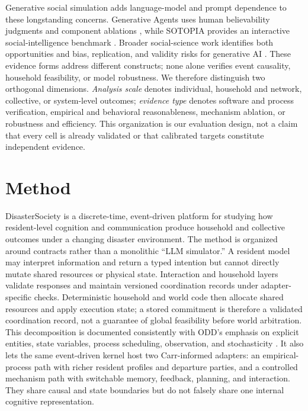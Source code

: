 \documentclass[journal]{IEEEtran}
\begin{document}
Generative social simulation adds language-model and prompt dependence to these
longstanding concerns. Generative Agents uses human believability judgments and
component ablations \cite{park2023generativeagents}, while SOTOPIA provides an
interactive social-intelligence benchmark \cite{zhou2024sotopia}. Broader
social-science work identifies both opportunities and bias, replication, and
validity risks for generative AI \cite{bail2024generativeai}. These evidence
forms address different constructs; none alone verifies event causality,
household feasibility, or model robustness. We
therefore distinguish two orthogonal dimensions. \emph{Analysis scale} denotes
individual, household and network, collective, or system-level outcomes;
\emph{evidence type} denotes software and process verification, empirical and
behavioral reasonableness, mechanism ablation, or robustness and efficiency.
This organization is our evaluation design, not a claim that every cell is
already validated or that calibrated targets constitute independent evidence.


\section{Method}
\label{sec:method}

DisasterSociety is a discrete-time, event-driven platform for studying how
resident-level cognition and communication produce household and collective
outcomes under a changing disaster environment. The method is organized around
contracts rather than a monolithic ``LLM simulator.'' A resident model may
interpret information and return a typed intention but cannot directly mutate
shared resources or physical state. Interaction and household layers validate
responses and maintain versioned coordination records under adapter-specific
checks. Deterministic household and world code then allocate shared resources
and apply execution state; a stored commitment is therefore a validated
coordination record, not a guarantee of global feasibility before world
arbitration. This decomposition is documented consistently with ODD's emphasis
on explicit entities, state variables, process scheduling, observation, and
stochasticity \cite{grimm2020odd}. It also lets the
same event-driven kernel host two Carr-informed adapters: an empirical-process
path with richer resident profiles and departure parties, and a controlled
mechanism path with switchable memory, feedback, planning, and interaction.
They share causal and state boundaries but do not falsely share one internal
cognitive representation.
\end{document}
